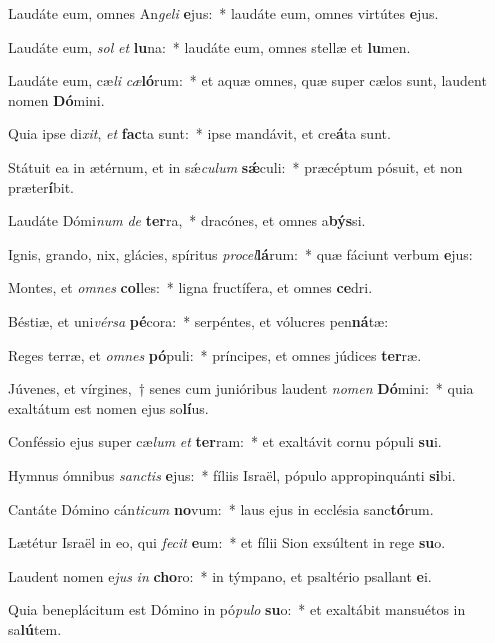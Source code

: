\item Laudáte eum, omnes An\textit{ge}\textit{li} \textbf{e}jus:~* laudáte eum, omnes virtútes \textbf{e}jus.
\item Laudáte eum, \textit{sol} \textit{et} \textbf{lu}na:~* laudáte eum, omnes stellæ et \textbf{lu}men.
\item Laudáte eum, cæ\textit{li} \textit{cæ}\textbf{ló}rum:~* et aquæ omnes, quæ super cælos sunt, laudent nomen \textbf{Dó}mini.
\item Quia ipse di\textit{xit}, \textit{et} \textbf{fac}ta sunt:~* ipse mandávit, et cre\textbf{á}ta sunt.
\item Státuit ea in ætérnum, et in sǽ\textit{cu}\textit{lum} \textbf{sǽ}culi:~* præcéptum pósuit, et non præter\textbf{í}bit.
\item Laudáte Dómi\textit{num} \textit{de} \textbf{ter}ra,~* dracónes, et omnes a\textbf{býs}si.
\item Ignis, grando, nix, glácies, spíritus \textit{pro}\textit{cel}\textbf{lá}rum:~* quæ fáciunt verbum \textbf{e}jus:
\item Montes, et \textit{om}\textit{nes} \textbf{col}les:~* ligna fructífera, et omnes \textbf{ce}dri.
\item Béstiæ, et uni\textit{vér}\textit{sa} \textbf{pé}cora:~* serpéntes, et vólucres pen\textbf{ná}tæ:
\item Reges terræ, et \textit{om}\textit{nes} \textbf{pó}puli:~* príncipes, et omnes júdices \textbf{ter}ræ.
\item Júvenes, et vírgines,~† senes cum junióribus laudent \textit{no}\textit{men} \textbf{Dó}mini:~* quia exaltátum est nomen ejus so\textbf{lí}us.
\item Conféssio ejus super cæ\textit{lum} \textit{et} \textbf{ter}ram:~* et exaltávit cornu pópuli \textbf{su}i.
\item Hymnus ómnibus \textit{sanc}\textit{tis} \textbf{e}jus:~* fíliis Israël, pópulo appropinquánti \textbf{si}bi.
\item Cantáte Dómino cán\textit{ti}\textit{cum} \textbf{no}vum:~* laus ejus in ecclésia sanc\textbf{tó}rum.
\item Lætétur Israël in eo, qui \textit{fe}\textit{cit} \textbf{e}um:~* et fílii Sion exsúltent in rege \textbf{su}o.
\item Laudent nomen e\textit{jus} \textit{in} \textbf{cho}ro:~* in týmpano, et psaltério psallant \textbf{e}i.
\item Quia beneplácitum est Dómino in pó\textit{pu}\textit{lo} \textbf{su}o:~* et exaltábit mansuétos in sa\textbf{lú}tem.
